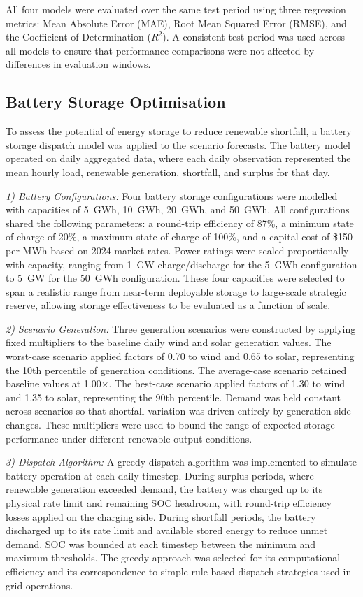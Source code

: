 \documentclass[conference]{IEEEtran}
\begin{document}
All four models were evaluated over the same test period using three regression metrics: Mean Absolute Error (MAE), Root Mean Squared Error (RMSE), and the Coefficient of Determination (\(R^2\)). A consistent test period was used across all models to ensure that performance comparisons were not affected by differences in evaluation windows.
 
\subsection{Battery Storage Optimisation}
 
To assess the potential of energy storage to reduce renewable shortfall, a battery storage dispatch model was applied to the scenario forecasts. The battery model operated on daily aggregated data, where each daily observation represented the mean hourly load, renewable generation, shortfall, and surplus for that day.
 
\textit{1) Battery Configurations:} Four battery storage configurations were modelled with capacities of 5~GWh, 10~GWh, 20~GWh, and 50~GWh. All configurations shared the following parameters: a round-trip efficiency of 87\%, a minimum state of charge of 20\%, a maximum state of charge of 100\%, and a capital cost of \$150 per MWh based on 2024 market rates. Power ratings were scaled proportionally with capacity, ranging from 1~GW charge/discharge for the 5~GWh configuration to 5~GW for the 50~GWh configuration. These four capacities were selected to span a realistic range from near-term deployable storage to large-scale strategic reserve, allowing storage effectiveness to be evaluated as a function of scale.
 
\textit{2) Scenario Generation:} Three generation scenarios were constructed by applying fixed multipliers to the baseline daily wind and solar generation values. The worst-case scenario applied factors of 0.70 to wind and 0.65 to solar, representing the 10th percentile of generation conditions. The average-case scenario retained baseline values at 1.00$\times$. The best-case scenario applied factors of 1.30 to wind and 1.35 to solar, representing the 90th percentile. Demand was held constant across scenarios so that shortfall variation was driven entirely by generation-side changes. These multipliers were used to bound the range of expected storage performance under different renewable output conditions.
 
\textit{3) Dispatch Algorithm:} A greedy dispatch algorithm was implemented to simulate battery operation at each daily timestep. During surplus periods, where renewable generation exceeded demand, the battery was charged up to its physical rate limit and remaining SOC headroom, with round-trip efficiency losses applied on the charging side. During shortfall periods, the battery discharged up to its rate limit and available stored energy to reduce unmet demand. SOC was bounded at each timestep between the minimum and maximum thresholds. The greedy approach was selected for its computational efficiency and its correspondence to simple rule-based dispatch strategies used in grid operations.
 
\end{document}
